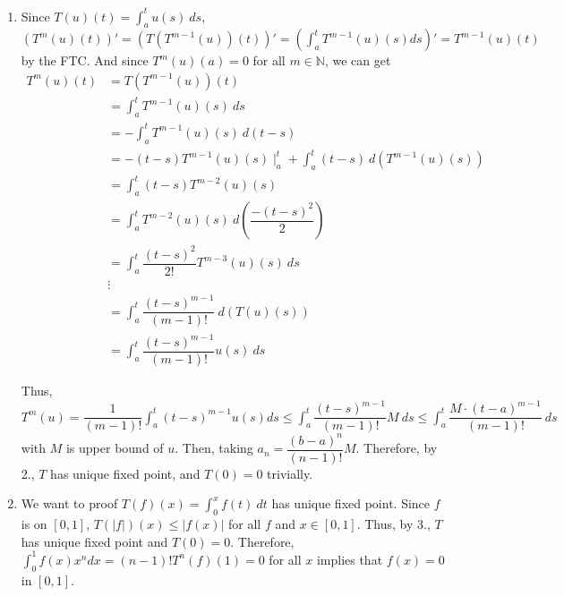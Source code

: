 \documentclass[12pt]{article}
\begin{document}
\begin{enumerate}
    \item Since $T(u)(t) = \displaystyle\int_a^t u(s)\ ds$, 
    $\left( T^m(u)(t)\right)' = \left( T(T^{m-1}(u))(t)\right)' = \left( \displaystyle\int_{a}^{t} T^{m-1}(u)(s) ds\right)' = T^{m-1}(u)(t)$ by the FTC.
    And since $T^m(u)(a) = 0$ for all $m\in \mathbb{N}$,
    we can get \begin{align*}
        T^{m}(u)(t) &= T(T^{m-1}(u))(t)\\
        &= \int_{a}^{t} T^{m-1}(u)(s)\ ds\\
        &= -\int_{a}^{t} T^{m-1}(u)(s)\ d(t-s)\\
        &= - (t-s) T^{m-1}(u)(s)\mid_a^t + \int_{a}^{t} (t-s)\ d(T^{m-1}(u)(s))\\
        &= \int_{a}^{t} (t-s)T^{m-2}(u)(s)\\
        &= \int_{a}^{t} T^{m-2}(u)(s)\ d(\dfrac{-(t-s)^2}{2})\\
        &= \int_{a}^{t} \dfrac{(t-s)^2}{2!} T^{m-3}(u)(s)\ ds\\
        &\vdots\\
        &= \int_{a}^{t} \dfrac{(t-s)^{m-1}}{(m-1)!} \ d(T(u)(s))\\
        &= \int_{a}^{t} \dfrac{(t-s)^{m-1}}{(m-1)!} u(s)\ ds
    \end{align*}

    Thus, $T^m(u) = \dfrac{1}{(m-1)!}\displaystyle\int_{a}^{t} (t-s)^{m-1} u(s) ds \leq \displaystyle\int_{a}^{t} \dfrac{(t-s)^{m-1}}{(m-1)!} M\ ds \leq \displaystyle\int_{a}^{t} \dfrac{M\cdot (t-a)^{m-1}}{(m-1)!}\ ds$
    with $M$ is upper bound of $u$. Then, taking $a_n = \dfrac{(b-a)^n}{(n-1)!}M$.
    Therefore, by 2., $T$ has unique fixed point, and $T(0) = 0$ trivially.

    \item We want to proof $T(f)(x) = \displaystyle\int_0^x f(t)\ dt$ has unique fixed point.
    Since $f$ is on $[0, 1]$, $T(|f|)(x) \leq |f(x)|$ for all $f$ and $x\in [0, 1]$.
    Thus, by 3., $T$ has unique fixed point and $T(0) = 0$. 
    Therefore, $\displaystyle\int_{0}^{1} f(x) x^n dx = (n-1)!T^n(f)(1) = 0$ for all $x$ implies that $f(x) = 0$ in $[0, 1]$.
\end{enumerate}
\end{document}
